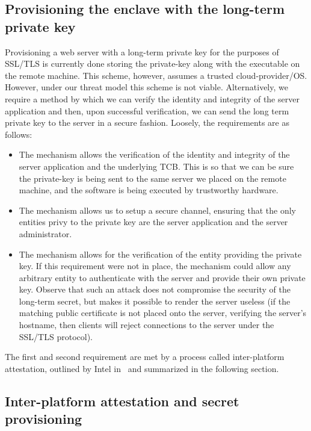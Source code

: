 \documentclass[../main.tex]{subfiles}
\begin{document}
\subsection{Provisioning the enclave with the long-term private key}

Provisioning a web server with a long-term private key for the
purposes of SSL/TLS is currently done storing the private-key along
with the executable on the remote machine. This scheme, however,
assumes a trusted cloud-provider/OS. However, under our threat model
this scheme is not viable. Alternatively, we require a method by which
we can verify the identity and integrity of the server application and
then, upon successful verification, we can send the long term private
key to the server in a secure fashion. Loosely, the requirements are
as follows:
\begin{itemize}
  \item The mechanism allows the verification of the identity and
    integrity of the server application and the underlying TCB.  This is
    so that we can be sure the private-key is being sent to the same
    server we placed on the remote machine, and the software is being
    executed by trustworthy hardware.
  \item The mechanism allows us to setup a secure channel, ensuring that
    the only entities privy to the private key are the server
    application and the server administrator.
  \item The mechanism allows for the verification of the entity
    providing the private key. If this requirement were not in place,
    the mechanism could allow any arbitrary entity to authenticate with
    the server and provide their own private key. Observe that such an
    attack does not compromise the security of the long-term secret, but
    makes it possible to render the server useless (if the matching
    public certificate is not placed onto the server, verifying the
    server's hostname, then clients will reject connections to the
    server under the SSL/TLS protocol). %
\end{itemize}
The first and second requirement are met by a process called
inter-platform attestation, outlined by Intel
in~\cite{IntelCorporation2010} and summarized in the following
section.

\subsection{Inter-platform attestation and secret provisioning}
\end{document}

